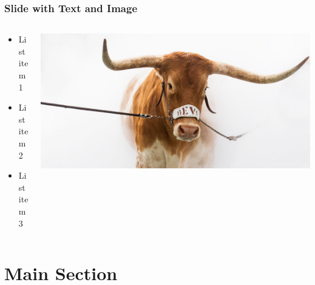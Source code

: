 \documentclass[18pt,xcolor=table]{beamer}
\begin{document}

\begin{frame}
    \frametitle{Slide with Text and Image}
    \begin{columns}
    \begin{column}{0.4\linewidth}
        \begin{itemize}
            \item List item 1
            \item List item 2
            \item List item 3
        \end{itemize}
    \end{column}%
    \begin{column}{0.6\linewidth}
        \centering
        \includegraphics[scale=0.2]{figs/bevo.png}
    \end{column}
    \end{columns}
\end{frame}


\section{Main Section} %

\end{document}
